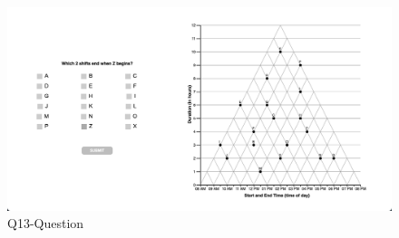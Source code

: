 \documentclass[
  letterpaper,
  DIV=11,
  numbers=noendperiod]{scrreprt}
\begin{document}
\begin{figure}

{\centering \includegraphics{analysis/SGC3A/static/questions/Q13.png}

}

\caption{\label{fig-Q13}Q13-Question}

\end{figure}
\end{document}
